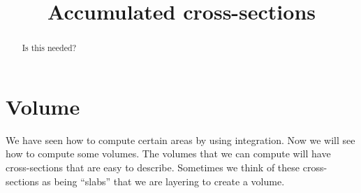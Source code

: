 \documentclass{ximera}
\title[Dig-In:]{Accumulated cross-sections}
\begin{document}
\begin{abstract}
  Is this needed?
\end{abstract}
\maketitle

\section{Volume}

We have seen how to compute certain areas by using integration. Now we
will see how to compute some volumes.  The volumes that we can compute
will have cross-sections that are easy to describe. Sometimes we think
of these cross-sections as being ``slabs'' that we are layering to
create a volume.
\end{document}
